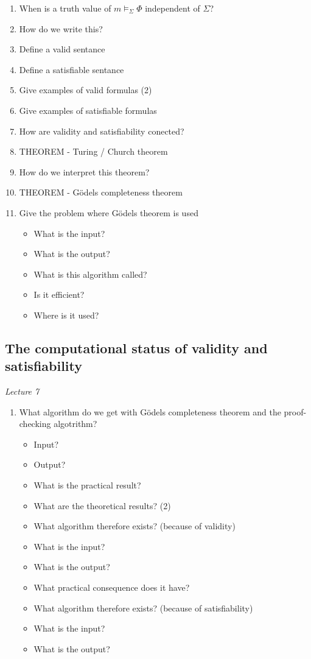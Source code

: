\documentclass[fleqn]{article}
\begin{document}
\begin{enumerate}
    \item When is a truth value of $m \models_{\Sigma} \Phi$ independent of $\Sigma$?
    \item How do we write this?
    \item Define a valid sentance
    \item Define a satisfiable sentance
    \item Give examples of valid formulas (2)
    \item Give examples of satisfiable formulas
    \item How are validity and satisfiability conected?
    \item THEOREM - Turing / Church theorem
    \item How do we interpret this theorem?
    \item THEOREM  - Gödels completeness theorem
    \item Give the problem where Gödels theorem is used
    \begin{itemize}
        \item What is the input?
        \item What is the output?
        \item What is this algorithm called?
        \item Is it efficient?
        \item Where is it used?
    \end{itemize}
\end{enumerate}


\subsection{The computational status of validity and satisfiability}
\textit{Lecture 7}
\begin{enumerate}
    \item What algorithm do we get with Gödels completeness theorem and the proof-checking algotrithm?
    \begin{itemize}
        \item Input?
        \item Output?
        \item What is the practical result?
        \item What are the theoretical results? (2)
        \item What algorithm therefore exists? (because of validity)
        \item What is the input?
        \item What is the output?
        \item What practical consequence does it have?
        \item What algorithm therefore exists? (because of satisfiability)
        \item What is the input?
        \item What is the output?
    \end{itemize}
\end{enumerate}
\end{document}
